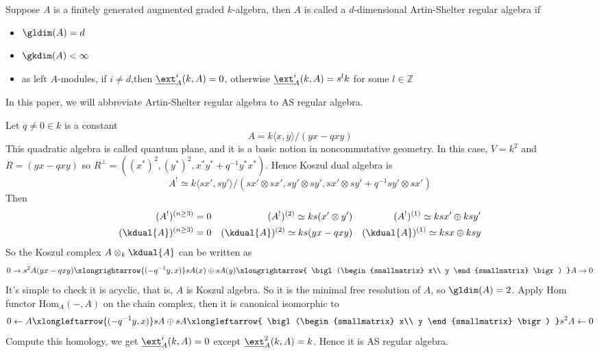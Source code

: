 \begin{mydefn}
Suppose $A$ is a finitely generated augmented graded $k$-algebra, then $A$ is called a $d$-dimensional Artin-Shelter regular algebra if 
\begin{itemize}
    \item $\gldim (A) =d $
    \item $\gkdim (A) < \infty$
    \item as left $A$-modules, if $i \neq d$,then $\underline{\ext}_{A}^{i}(k,A)=0 $, otherwise $\underline{\ext}_{A}^{i}(k,A)=s^{l}k$ for some $l \in \mathbb{Z}$
\end{itemize}
\end{mydefn}
In this paper, we will abbreviate Artin-Shelter regular algebra to AS regular algebra.\\
\begin{ex}
Let $q \neq 0 \in k $ is a constant
\[
A= k\langle{x,y}\rangle /(yx - qxy)
\]
This quadratic algebra is called quantum plane, and it is a basic notion in noncommutative geometry. In this case, $V= k^{2}$ and $R=(yx-qxy)$ so $R^{\bot}=((x^{*})^2,(y^{*})^2,x^{*}y^{*}+q^{-1}y^{*}x^{*})$. Hence Koszul dual algebra is 
\[
{A}^{!} \simeq k \langle{sx',sy'}\rangle /(sx' \otimes sx', sy' \otimes sy', sx' \otimes sy' + q^{-1} sy' \otimes sx')
\]
Then 
\begin{align*}
    ({A}^{!})^{(n\geq 3)}=0 &  &
    ({A}^{!})^{(2)} \simeq ks(x' \otimes y')& &
    ({A}^{!})^{(1)} \simeq ksx' \oplus ksy' \\
    (\kdual{A})^{(n\geq 3)}=0 &  &
    (\kdual{A})^{(2)} \simeq ks(yx-qxy)& &
    (\kdual{A})^{(1)} \simeq ksx \oplus ksy 
\end{align*}
So the Koszul complex $A \otimes_{k} \kdual{A}$ can be written as 
\[
0 \rightarrow s^{2}A(yx-qxy) \xlongrightarrow{(-q^{-1}y,x)} sA(x) \oplus sA(y) \xlongrightarrow{
\bigl(\begin{smallmatrix}
x\\
y
\end{smallmatrix} \bigr) }A \rightarrow 0 
\]
It's simple to check it is acyclic, that is,  $A$ is Koszul algebra. So it is the minimal free resolution of $A$, so $\gldim(A)=2$. Apply Hom functor $\text{Hom}_{A}(-,A)$ on the chain complex, then it is canonical isomorphic to
\[
0 \leftarrow A \xlongleftarrow{(-q^{-1}y,x)} sA \oplus sA \xlongleftarrow{
\bigl(\begin{smallmatrix}
x\\
y
\end{smallmatrix} \bigr) }s^{2}A \leftarrow 0 
\]
Compute this homology, we get  $\underline{\ext}_{A}^{i}(k,A)=0$ except $\underline{\ext}_{A}^{2}(k,A)=k$. Hence it is AS regular algebra.
\end{ex}
